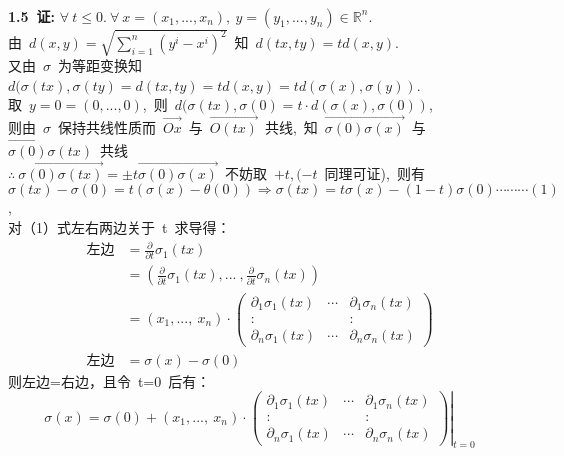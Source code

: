 	
	\noindent
	\\
	{\textbf{1.5\ 证:}}
	$\forall\ t\leq 0.\ 
	\forall\ x=(x_1,...,x_n),\ y=(y_1,...,y_n)\in \mathbb{R}^n$.
	\\
	由\ 
	$d(x,y)=\sqrt{\sum\limits_{i=1}^n (y^i-x^i)^2}$\ 
	知\ 
	$d(tx,ty)=td(x,y)$.\ 
	\\
	又由\ 
	$\sigma$\ 
	为等距变换知\ 
	$d(\sigma(tx),\sigma(ty)=d(tx,ty)=td(x,y)=td(\sigma(x),\sigma(y))$.\ 
	\\
	取\ 
	$y=\mathit{0}=(0,...,0)$,\ 
	则\ 
	$d(\sigma (tx),\sigma (\mathit{0})=t\cdot d(\sigma(x),\sigma (\mathit{0}))$,\ 
	\\
	则由\ 
	$\sigma $\ 
	保持共线性质而\ 
	$\overrightarrow{Ox}$\ 
	与\ 
	$\overrightarrow{O(tx)}$\ 
	共线,\ 知\ 
	$\overrightarrow{\sigma(\mathit{0})\sigma(x)}$\ 
	与\ 
	$\overrightarrow{\sigma (\mathit{0})}\sigma(tx)$\ 
	共线\ 
	\\
	$\therefore\ \overrightarrow{\sigma(\mathit{0})\sigma(tx)}=\pm t\overrightarrow{\sigma(\mathit{0})\sigma(x)}$\ 
	不妨取\ 
	$+t,(-t$\ 
	同理可证),\ 则有\ 
	\\
	$\sigma (tx)-\sigma(\mathit{0})=t(\sigma (x)-\theta(\mathit{0}))\Rightarrow \sigma (tx)=t\sigma(x)-(1-t)\sigma(\mathit{0})\cdots\cdots\cdots(1)$,\ 
	\\
	对（1）式左右两边关于\ t\ 求导得：\ 
	\begin{align*}
	\text{左边}&=\frac{\partial}{\partial t}\sigma_1(tx)
	\\
	&=(\frac{\partial}{\partial t}\sigma_1(tx),...\ ,\frac{\partial}{\partial t}\sigma_n(tx)) 
	\\
	&=(x_1,...,\ x_n)\cdot
	\left(
	\begin{array}{ccc}
	\partial_1\sigma_1(tx)  &  \cdots & \partial_1\sigma_n(tx)
	\\
	\colon                  &\        &\colon
	\\
	\partial_n\sigma_1(tx)  &\cdots   &\partial_n\sigma_n(tx)
	\end{array}
	\right)
	\\
	\text{左边}&=\sigma(x)-\sigma (\mathit{0})
	\end{align*}
	则左边=右边，且令\ t=0\ 后有：\
	$$
	\sigma(x)=\sigma (\mathit{0})+
	(x_1,...,\ x_n)\cdot
	\left.
	\left(
	\begin{array}{ccc}
	\partial_1\sigma_1(tx)  &  \cdots & \partial_1\sigma_n(tx)
	\\
	\colon                  &\        &\colon
	\\
	\partial_n\sigma_1(tx)  &\cdots   &\partial_n\sigma_n(tx)
	\end{array}
	\right)
	\right|_{t=0}                                              
	$$

